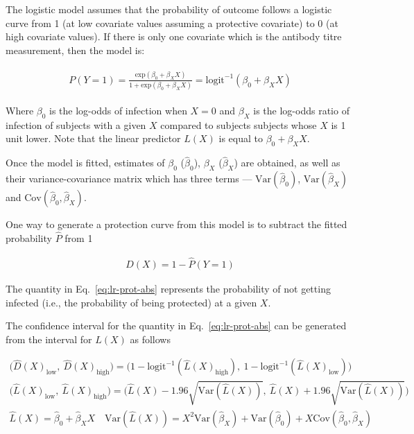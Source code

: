 The logistic model assumes that the probability of outcome follows a logistic curve from 1 (at low covariate values assuming a protective covariate) to 0 (at high covariate values). If there is only one covariate which is the antibody titre measurement, then the model is:

\begin{align*}
    \begin{gathered}
        P(Y=1) = \frac{\text{exp}(\beta_0 + \beta_X X)}{1 + \text{exp}(\beta_0 + \beta_X X)} = \text{logit}^{-1}(\beta_0 + \beta_X X)
    \end{gathered}
\end{align*}

Where $\beta_0$ is the log-odds of infection when $X=0$ and $\beta_X$ is the log-odds ratio of infection of subjects with a given $X$ compared to subjects subjects whose $X$ is 1 unit lower. Note that the linear predictor $L(X)$ is equal to $\beta_0 + \beta_X X$.

Once the model is fitted, estimates of $\beta_0$ ($\hat{\beta}_0$), $\beta_X$ ($\hat{\beta}_X$) are obtained, as well as their variance-covariance matrix which has three terms --- $\text{Var}(\hat{\beta}_0)$, $\text{Var}(\hat{\beta}_X)$ and $\text{Cov}(\hat{\beta}_0, \hat{\beta}_X)$.

One way to generate a protection curve from this model is to subtract the fitted probability $\hat{P}$ from 1

\begin{gather}
    D(X) = 1 - \hat{P}(Y=1)
    \label{eq:lr-prot-abs}
\end{gather}

The quantity in Eq.~\ref{eq:lr-prot-abs} represents the probability of not getting infected (i.e., the probability of being protected) at a given $X$.

The confidence interval for the quantity in Eq.~\ref{eq:lr-prot-abs} can be generated from the interval for $L(X)$ as follows

\begin{gather*}
    \big(\hat{D}(X)_{\text{low}},~\hat{D}(X)_{\text{high}}\big)  =
    \big(
    1 - \text{logit}^{-1}(\hat{L}(X)_{\text{high}}),~
    1 - \text{logit}^{-1}(\hat{L}(X)_{\text{low}})
    \big)                                                       \\
    \big(\hat{L}(X)_{\text{low}},~\hat{L}(X)_{\text{high}}\big)  =
    \big(
    \hat{L}(X) - 1.96 \sqrt{\text{Var}(\hat{L}(X))},~
    \hat{L}(X) + 1.96 \sqrt{\text{Var}(\hat{L}(X))}
    \big)                                                       \\
    \hat{L}(X) = \hat{\beta}_0 + \hat{\beta}_XX \quad
    \text{Var}(\hat{L}(X)) = X^2\text{Var}(\hat{\beta}_X) + \text{Var}(\hat{\beta}_0) + X \text{Cov}(\hat{\beta}_0, \hat{\beta}_X)
\end{gather*}

